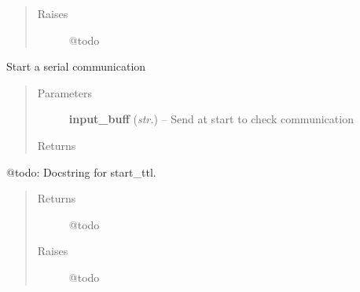 \documentclass[letterpaper,10pt,english]{sphinxmanual}
\begin{document}
\begin{fulllineitems}
\begin{fulllineitems}
\begin{quote}
\begin{description}
\item[{Raises}] \leavevmode
@todo

\end{description}\end{quote}

\end{fulllineitems}


\begin{fulllineitems}
\label{enuActor.Devices:enuActor.Devices.Device.Device.start_serial}
Start a serial communication
\begin{quote}\begin{description}
\item[{Parameters}] \leavevmode
\textbf{input\_buff} (\emph{str.}) -- Send at start to check communication

\item[{Returns}] \leavevmode
{}

\end{description}\end{quote}

\end{fulllineitems}


\begin{fulllineitems}
\label{enuActor.Devices:enuActor.Devices.Device.Device.start_ttl}
@todo: Docstring for start\_ttl.
\begin{quote}\begin{description}
\item[{Returns}] \leavevmode
@todo

\item[{Raises}] \leavevmode
@todo

\end{description}\end{quote}

\end{fulllineitems}


\end{fulllineitems}

\end{document}
